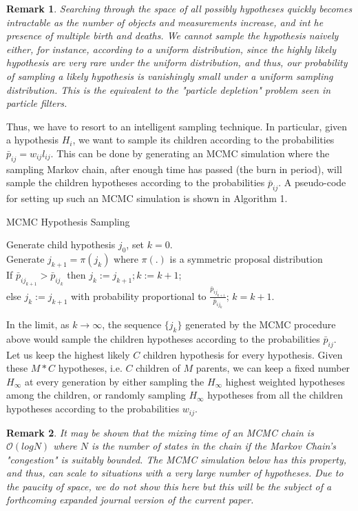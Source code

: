 \documentclass[10pt, conference]{IEEEtran}
\newtheorem{remark}{Remark}
\begin{document}
\begin{remark}
Searching through the space of all possibly hypotheses quickly becomes intractable as the number of objects and measurements increase, and int he presence of multiple birth and deaths.
We cannot sample the hypothesis naively  either, for instance, according to a uniform distribution, since the highly likely hypothesis are very rare under the uniform distribution, and thus, our probability of sampling a likely hypothesis is vanishingly small under a uniform sampling distribution. This is the equivalent to the "particle depletion" problem seen in particle filters.
\end{remark}
Thus, we have to resort to an intelligent sampling technique.
In particular, given a hypothesis $H_i$, we want to sample its children according to the probabilities $\bar{p}_{ij} = w_{ij}l_{ij}$. This can be done by generating an MCMC simulation where the sampling Markov chain, after enough time has passed (the burn in period), will sample the children hypotheses according to the probabilities $\bar{p}_{ij}$.  A pseudo-code for setting up such an MCMC simulation is shown in Algorithm 1.
\begin{algorithm}
\caption{MCMC Hypothesis Sampling}
Generate child hypothesis $j_0$, set $k=0$.\\
Generate $j_{k+1} = \pi(j_k)$ where $\pi(.)$ is a symmetric proposal distribution\\
If $\bar{p}_{ij_{k+1}}> \bar{p}_{ij_k}$ then $ j_{k} := j_{k+1}; k:= k+1$;\\
else $j_k := j_{k+1}$ with probability proportional to $\frac{\bar{p}_{ij_{k+1}}}{\bar{p}_{ij_k}}$; $k = k+1$.
\end{algorithm}
In the limit, as $k\rightarrow \infty$, the sequence $\{j_k\}$ generated by the MCMC procedure above would sample the children hypotheses according to the probabilities $\bar{p}_{ij}$. Let us keep the highest likely $C$ children hypothesis for every hypothesis.
Given these $M*C$ hypotheses, i.e. $C$ children of $M$ parents, we can keep a fixed number $H_{\infty}$ at every generation by either sampling the $H_{\infty}$ highest weighted hypotheses among the children, or randomly sampling $H_{\infty}$ hypotheses from all the children hypotheses according to the probabilities $w_{ij}$. \\
\begin{remark}
It may be shown that the mixing time of an MCMC chain is $\mathcal{O}(log N)$ where $N$ is the number of states in the chain \cite{MCMT} if the Markov Chain's  "congestion" is suitably bounded. The MCMC simulation below has this property, and thus, can scale to situations with a very large number of hypotheses. Due to the paucity of space, we do not show this here but this will be the subject of a forthcoming expanded journal version of the current paper.
\end{remark}
\end{document}
